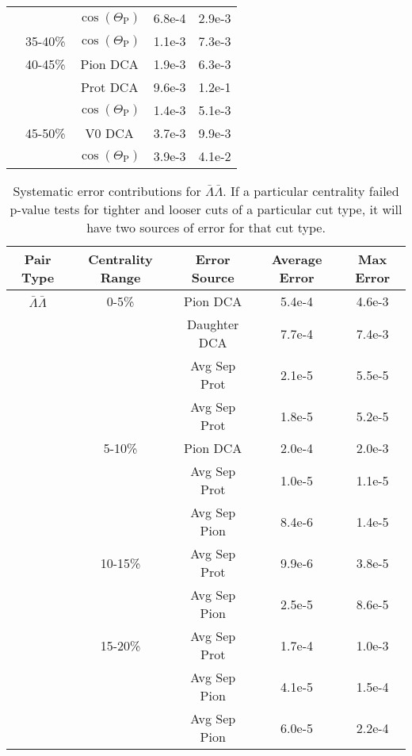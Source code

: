 \begin{table}
\begin{center}
\begin{tabular}{| c | c | c | c | c |}
   &         & $\cos(\Theta_{\mathrm{P}})$ & 6.8e-4 & 2.9e-3 \\
   & 35-40\% & $\cos(\Theta_{\mathrm{P}})$ & 1.1e-3 & 7.3e-3 \\
   & 40-45\% & Pion DCA & 1.9e-3 & 6.3e-3 \\
   &         & Prot DCA & 9.6e-3 & 1.2e-1 \\
   &         & $\cos(\Theta_{\mathrm{P}})$ & 1.4e-3 & 5.1e-3 \\ 
   & 45-50\% & V0 DCA & 3.7e-3 & 9.9e-3 \\
   &         & $\cos(\Theta_{\mathrm{P}})$ & 3.9e-3 & 4.1e-2 \\
   \hline
\end{tabular}
\end{center}
\end{table}
\begin{table}
\caption[Systematic error contributions for $\bar{\Lambda}\bar{\Lambda}$] {Systematic error contributions for $\bar{\Lambda}\bar{\Lambda}$.  
If a particular centrality failed p-value tests for tighter and looser cuts of a particular cut type, it will have two sources of error for that cut type.} \label{tab:SysErrorSourcesAA} 
\begin{center}
\begin{tabular}{| c | c | c | c | c |}
  \hline                         
  Pair Type & Centrality Range & Error Source & Average Error & Max Error \\
  \hline 
  $\bar{\Lambda}\bar{\Lambda}$ & 0-5\% & Pion DCA & 5.4e-4 & 4.6e-3 \\
   &        & Daughter DCA & 7.7e-4 & 7.4e-3 \\
   &        & Avg Sep Prot & 2.1e-5 & 5.5e-5 \\
   &         & Avg Sep Prot & 1.8e-5 & 5.2e-5 \\
   & 5-10\% & Pion DCA & 2.0e-4 & 2.0e-3 \\
   &         & Avg Sep Prot & 1.0e-5 & 1.1e-5 \\
   &         & Avg Sep Pion & 8.4e-6 & 1.4e-5 \\
   & 10-15\% & Avg Sep Prot & 9.9e-6 & 3.8e-5 \\
   &         & Avg Sep Pion & 2.5e-5 & 8.6e-5 \\
   & 15-20\% & Avg Sep Prot & 1.7e-4 & 1.0e-3 \\
   &         & Avg Sep Pion & 4.1e-5 & 1.5e-4 \\
   &         & Avg Sep Pion & 6.0e-5 & 2.2e-4 \\

\end{tabular}
\end{center}
\end{table}
